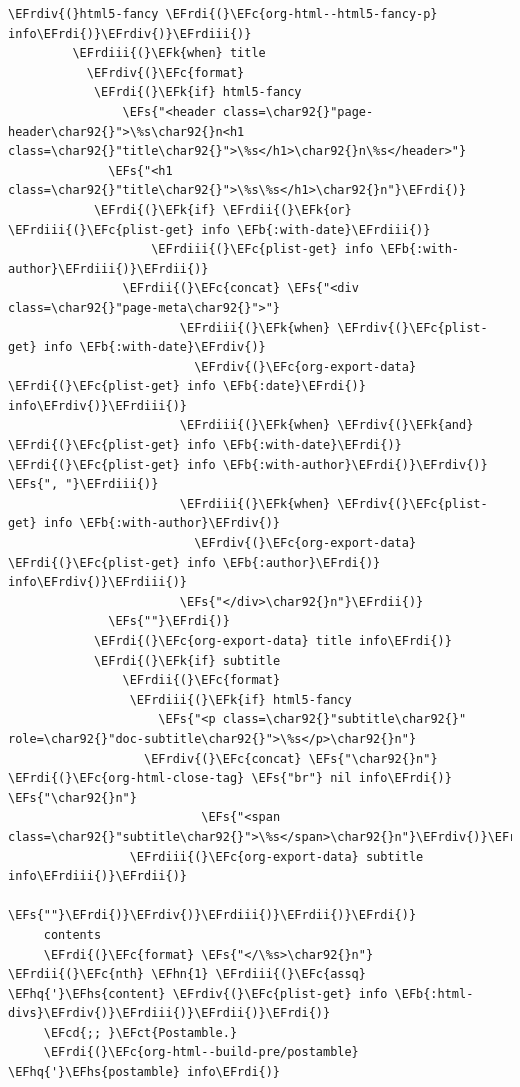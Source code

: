 \documentclass{scrartcl}
\newcommand{\EFk}[1]{\textcolor{EFk}{#1}} %
\newcommand{\EFs}[1]{\textcolor{EFs}{#1}} %
\newcommand{\EFb}[1]{\textcolor{EFb}{#1}} %
\newcommand{\EFct}[1]{\textcolor{EFct}{#1}} %
\newcommand{\EFc}[1]{\textcolor{EFc}{#1}} %
\newcommand{\EFcd}[1]{\textcolor{EFcd}{#1}} %
\newcommand{\EFhn}[1]{\textcolor{EFhn}{\textbf{#1}}} %
\newcommand{\EFhq}[1]{\textcolor{EFhq}{#1}} %
\newcommand{\EFhs}[1]{\textcolor{EFhs}{#1}} %
\newcommand{\EFrdi}[1]{\textcolor{EFrdi}{#1}} %
\newcommand{\EFrdii}[1]{\textcolor{EFrdii}{#1}} %
\newcommand{\EFrdiii}[1]{\textcolor{EFrdiii}{#1}} %
\newcommand{\EFrdiv}[1]{\textcolor{EFrdiv}{#1}} %
\begin{document}
\begin{Code}
\begin{Verbatim}[]
             \EFrdiv{(}html5-fancy \EFrdi{(}\EFc{org-html--html5-fancy-p} info\EFrdi{)}\EFrdiv{)}\EFrdiii{)}
         \EFrdiii{(}\EFk{when} title
           \EFrdiv{(}\EFc{format}
            \EFrdi{(}\EFk{if} html5-fancy
                \EFs{"<header class=\char92{}"page-header\char92{}">\%s\char92{}n<h1 class=\char92{}"title\char92{}">\%s</h1>\char92{}n\%s</header>"}
              \EFs{"<h1 class=\char92{}"title\char92{}">\%s\%s</h1>\char92{}n"}\EFrdi{)}
            \EFrdi{(}\EFk{if} \EFrdii{(}\EFk{or} \EFrdiii{(}\EFc{plist-get} info \EFb{:with-date}\EFrdiii{)}
                    \EFrdiii{(}\EFc{plist-get} info \EFb{:with-author}\EFrdiii{)}\EFrdii{)}
                \EFrdii{(}\EFc{concat} \EFs{"<div class=\char92{}"page-meta\char92{}">"}
                        \EFrdiii{(}\EFk{when} \EFrdiv{(}\EFc{plist-get} info \EFb{:with-date}\EFrdiv{)}
                          \EFrdiv{(}\EFc{org-export-data} \EFrdi{(}\EFc{plist-get} info \EFb{:date}\EFrdi{)} info\EFrdiv{)}\EFrdiii{)}
                        \EFrdiii{(}\EFk{when} \EFrdiv{(}\EFk{and} \EFrdi{(}\EFc{plist-get} info \EFb{:with-date}\EFrdi{)} \EFrdi{(}\EFc{plist-get} info \EFb{:with-author}\EFrdi{)}\EFrdiv{)} \EFs{", "}\EFrdiii{)}
                        \EFrdiii{(}\EFk{when} \EFrdiv{(}\EFc{plist-get} info \EFb{:with-author}\EFrdiv{)}
                          \EFrdiv{(}\EFc{org-export-data} \EFrdi{(}\EFc{plist-get} info \EFb{:author}\EFrdi{)} info\EFrdiv{)}\EFrdiii{)}
                        \EFs{"</div>\char92{}n"}\EFrdii{)}
              \EFs{""}\EFrdi{)}
            \EFrdi{(}\EFc{org-export-data} title info\EFrdi{)}
            \EFrdi{(}\EFk{if} subtitle
                \EFrdii{(}\EFc{format}
                 \EFrdiii{(}\EFk{if} html5-fancy
                     \EFs{"<p class=\char92{}"subtitle\char92{}" role=\char92{}"doc-subtitle\char92{}">\%s</p>\char92{}n"}
                   \EFrdiv{(}\EFc{concat} \EFs{"\char92{}n"} \EFrdi{(}\EFc{org-html-close-tag} \EFs{"br"} nil info\EFrdi{)} \EFs{"\char92{}n"}
                           \EFs{"<span class=\char92{}"subtitle\char92{}">\%s</span>\char92{}n"}\EFrdiv{)}\EFrdiii{)}
                 \EFrdiii{(}\EFc{org-export-data} subtitle info\EFrdiii{)}\EFrdii{)}
              \EFs{""}\EFrdi{)}\EFrdiv{)}\EFrdiii{)}\EFrdii{)}\EFrdi{)}
     contents
     \EFrdi{(}\EFc{format} \EFs{"</\%s>\char92{}n"} \EFrdii{(}\EFc{nth} \EFhn{1} \EFrdiii{(}\EFc{assq} \EFhq{'}\EFhs{content} \EFrdiv{(}\EFc{plist-get} info \EFb{:html-divs}\EFrdiv{)}\EFrdiii{)}\EFrdii{)}\EFrdi{)}
     \EFcd{;; }\EFct{Postamble.}
     \EFrdi{(}\EFc{org-html--build-pre/postamble} \EFhq{'}\EFhs{postamble} info\EFrdi{)}

\end{Verbatim}
\end{Code}
\end{document}
